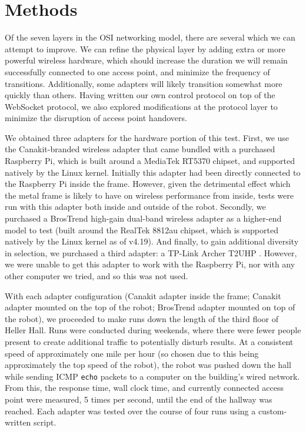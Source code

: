 \documentclass[letterpaper, 11pt]{article}
\begin{document}
\section{Methods}
\begin{multicols}{2}
Of the seven layers in the OSI networking model, there are several which we
can attempt to improve. We can refine the physical layer by adding extra or
more powerful wireless hardware, which should increase the duration we will
remain successfully connected to one access point, and minimize the frequency
of transitions. Additionally, some adapters will likely transition somewhat
more quickly than others. Having written our own control protocol on top of
the WebSocket protocol\cite{protocol}, we also explored modifications at the
protocol layer to minimize the disruption of access point handovers.

We obtained three adapters for the hardware portion of this test. First, we
use the Canakit-branded wireless adapter that came bundled with a purchased
Raspberry Pi\cite{canakit}, which is built around a MediaTek RT5370 chipset,
and supported natively by the Linux kernel. Initially this adapter had been
directly connected to the Raspberry Pi inside the frame. However, given the
detrimental effect which the metal frame is likely to have on wireless 
performance from inside, tests were run with this adapter both inside and
outside of the robot. Secondly, we purchased a BrosTrend high-gain dual-band
wireless adapter as a higher-end model to test\cite{brostrend} (built around
the RealTek 8812au chipset, which is supported natively by the Linux kernel
as of v4.19). And finally, to gain additional diversity in selection, we
purchased a third adapter: a TP-Link Archer T2UHP \cite{archer}. However,
we were unable to get this adapter to work with the Raspberry Pi, nor with
any other computer we tried, and so this was not used.

With each adapter configuration (Canakit adapter inside the frame; Canakit
adapter mounted on the top of the robot; BrosTrend adapter mounted on top
of the robot), we proceeded to make runs down the length of the third
floor of Heller Hall. Runs were conducted during weekends, where there were
fewer people present to create additional traffic to potentially disturb
results. At a consistent speed of approximately one mile per hour (so chosen
due to this being approximately the top speed of the robot), the robot was
pushed down the hall while sending ICMP \texttt{echo} packets to a computer
on the building's wired network. From this, the response time, wall clock
time, and currently connected access point were measured, 5 times per second,
until the end of the hallway was reached. Each adapter was tested over the
course of four runs using a custom-written script\cite{hallway-script}.


\end{multicols}
\end{document}

